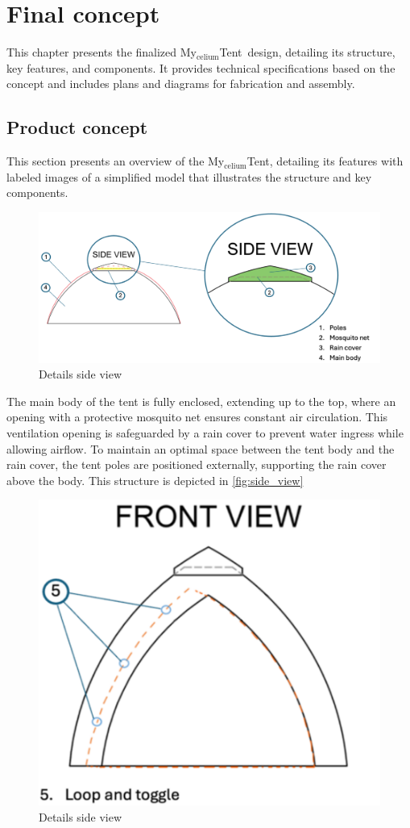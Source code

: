 \documentclass{article}
\newcommand{\myc}{My$_{\text{celium}}$Tent}
\begin{document}
\section{Final concept}
\label{sec:final_concept}
This chapter presents the finalized \myc\ design, detailing its structure, key features,
and components. It provides technical specifications based on the concept and includes plans
and diagrams for fabrication and assembly.

\subsection{Product concept}
This section presents an overview of the \myc, detailing its features with labeled
images of a simplified model that illustrates the structure and key components.

\begin{figure}[ht!]
    \centering
    \includegraphics[width=.85\textwidth]{media/side_view.png}
    \caption{Details side view}
    \label{fig:side_view}
\end{figure}

The main body of the tent is fully enclosed, extending up to the top, where an opening with a
protective mosquito net ensures constant air circulation. This ventilation opening is
safeguarded by a rain cover to prevent water ingress while allowing airflow. To maintain an
optimal space between the tent body and the rain cover, the tent poles are positioned
externally, supporting the rain cover above the body. This structure is depicted in \autoref{fig:side_view}

\newpage
\begin{figure}[ht!]
    \centering
    \includegraphics[width=.35\textwidth]{media/front_view.png}
    \caption{Details side view}
    \label{fig:front_view}
\end{figure}
\end{document}
